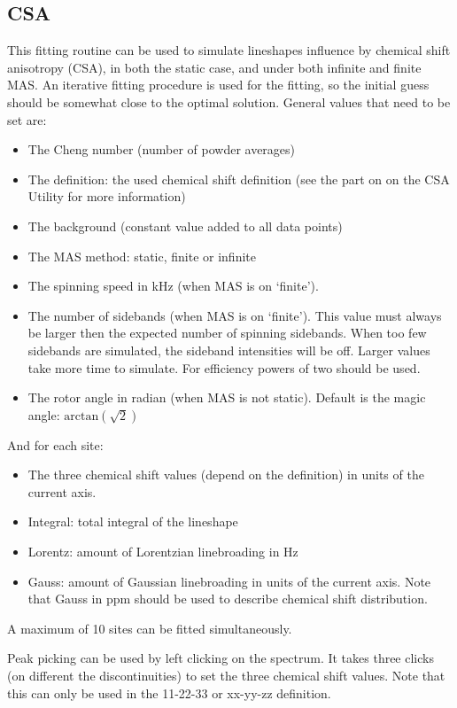 \documentclass[11pt,a4paper]{article}
\begin{document}
\subsection{CSA}
This fitting routine can be used to simulate lineshapes influence by chemical shift anisotropy
(CSA), in both the static case, and under both infinite and finite MAS. An iterative fitting
procedure is used for the fitting, so the initial guess should be somewhat close to the optimal
solution. General values that need to be set are:
\begin{itemize}
\item The Cheng number (number of powder averages)
\item The definition: the used chemical shift definition (see the part on on the CSA Utility for more information)
\item The background (constant value added to all data points)
\item The MAS method: static, finite or infinite
\item The spinning speed in kHz (when MAS is on `finite').
\item The number of sidebands (when MAS is on `finite'). This value must always be larger then the
  expected number of spinning sidebands. When too few sidebands are simulated, the sideband intensities will be off. 
Larger values take more time to simulate. For efficiency powers of two should be used.
\item The rotor angle in radian (when MAS is not static). Default is the magic angle:
	 $\text{arctan}(\sqrt{2})$
\end{itemize}
And for each site:
\begin{itemize}
\item The three chemical shift values (depend on the definition) in units of the current axis.
\item Integral: total integral of the lineshape
\item Lorentz: amount of Lorentzian linebroading in Hz
\item Gauss: amount of Gaussian linebroading in units of the current axis. Note that Gauss in ppm should be used to 
            describe chemical shift distribution.
\end{itemize}
A maximum of 10 sites can be fitted simultaneously.

Peak picking can be used by left clicking on the spectrum. It takes three clicks (on different the
discontinuities) to set the three chemical shift values. Note that this can only be used in the 11-22-33 or
xx-yy-zz definition.
\end{document}
